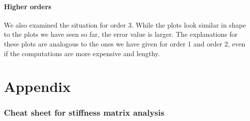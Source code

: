 \documentclass{article}
\begin{document}
\subsection{Higher orders}
\label{sec:stiffness-analysis-conclusion-higher-order}

We also examined the situation for order 3. While the plots look similar in shape to the plots we have seen so far, the error value is larger. The explanations for these plots are analogous to the ones we have given for order 1 and order 2, even if the computations are more expensive and lengthy.




\appendix

\clearpage{}
\part{Appendix}
\label{part:cheat-sheet}

\section{Cheat sheet for stiffness matrix analysis}
\label{sec:cheat-sheet-stiffn}

\newenvironment{meine}{}{}
\newcommand{\mypmatrix}[1]
{
  \begin{meine}
    \renewcommand{\arraystretch}{1}
    \begin{pmatrix}
      #1
    \end{pmatrix}
    \renewcommand{\arraystretch}{2}
  \end{meine}
}
\end{document}
